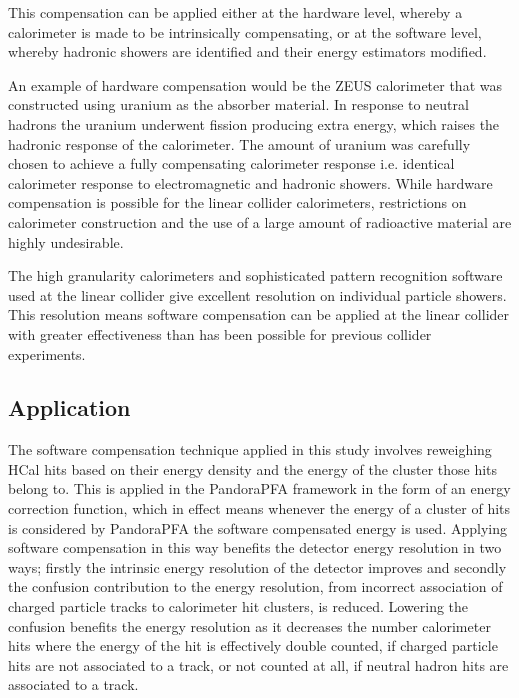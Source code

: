 This compensation can be applied either at the hardware level, whereby a calorimeter is made to be intrinsically compensating, or at the software level, whereby hadronic showers are identified and their energy estimators modified.  

An example of hardware compensation would be the ZEUS calorimeter \cite{Derrick:1991tq} that was constructed using uranium as the absorber material.  In response to neutral hadrons the uranium underwent fission producing extra energy, which raises the hadronic response of the calorimeter.  The amount of uranium was carefully chosen to achieve a fully compensating calorimeter response i.e. identical calorimeter response to electromagnetic and hadronic showers.  While hardware compensation is possible for the linear collider calorimeters, restrictions on calorimeter construction and the use of a large amount of radioactive material are highly undesirable.  

The high granularity calorimeters and sophisticated pattern recognition software used at the linear collider give excellent resolution on individual particle showers.  This resolution means software compensation can be applied at the linear collider with greater effectiveness than has been possible for previous collider experiments.  


\subsection{Application}
The software compensation technique applied in this study involves reweighing HCal hits based on their energy density and the energy of the cluster those hits belong to.  This is applied in the PandoraPFA framework in the form of an energy correction function, which in effect means whenever the energy of a cluster of hits is considered by PandoraPFA the software compensated energy is used.  Applying software compensation in this way benefits the detector energy resolution in two ways; firstly the intrinsic energy resolution of the detector improves and secondly the confusion contribution to the energy resolution, from incorrect association of charged particle tracks to calorimeter hit clusters, is reduced.  Lowering the confusion benefits the energy resolution as it decreases the number calorimeter hits where the energy of the hit is effectively double counted, if charged particle hits are not associated to a track, or not counted at all, if neutral hadron hits are associated to a track.   

